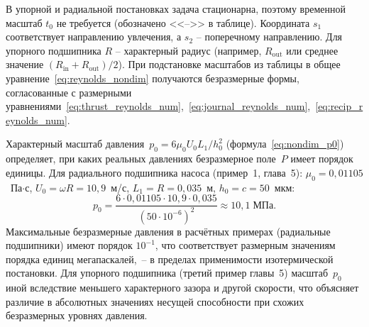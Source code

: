 \begin{table}[!ht]
\centering
\caption{Характерные масштабы для безразмерной постановки}
\label{tab:nondim_scales}
\end{table}

\FloatBarrier

В упорной и радиальной постановках задача стационарна, поэтому временной масштаб $t_0$ не требуется (обозначено <<-->>{} в таблице). Координата $s_1$ соответствует направлению увлечения, а $s_2$ -- поперечному направлению. Для упорного подшипника $R$ -- характерный радиус (например, $R_{\mathrm{out}}$ или среднее значение $(R_{\mathrm{in}} + R_{\mathrm{out}})/2$). При подстановке масштабов из таблицы в общее уравнение~\eqref{eq:reynolds_nondim} получаются безразмерные формы, согласованные с размерными уравнениями~\eqref{eq:thrust_reynolds_num},~\eqref{eq:journal_reynolds_num},~\eqref{eq:recip_reynolds_num}.

Характерный масштаб давления~$p_0 = 6\mu_0 U_0 L_1 / h_0^2$
(формула~\eqref{eq:nondim_p0}) определяет, при каких реальных
давлениях безразмерное поле~$P$ имеет порядок единицы.
Для радиального подшипника насоса (пример~1, глава~5): $\mu_0 = 0{,}01105$~Па$\cdot$с,
$U_0 = \omega R = 10{,}9$~м/с, $L_1 = R = 0{,}035$~м,
$h_0 = c = 50$~мкм:
%
\begin{equation}
  p_0 = \frac{6 \cdot 0{,}01105 \cdot 10{,}9
    \cdot 0{,}035}{(50 \cdot 10^{-6})^2}
  \approx 10{,}1 \;\text{МПа}.
  \label{eq:p0_example}
\end{equation}
%
Максимальные безразмерные давления в расчётных примерах
(радиальные подшипники) имеют порядок $10^{-1}$, что соответствует
размерным значениям порядка единиц мегапаскалей,~-- в пределах
применимости изотермической постановки. Для упорного подшипника
(третий пример главы~5) масштаб~$p_0$ иной вследствие меньшего
характерного зазора и другой скорости, что объясняет различие
в абсолютных значениях несущей способности при схожих
безразмерных уровнях давления.

